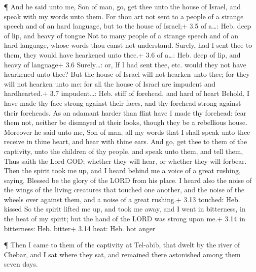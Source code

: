  ¶ And he said unto me, Son of man, go, get thee unto the
house of Israel, and speak with my words unto them.  For
thou art not sent to a people of a strange speech and of an hard
language, but to the house of Israel;+ 3.5 of a\ldots: Heb. deep of lip,
and heavy of tongue  Not to many people of a strange speech
and of an hard language, whose words thou canst not understand. Surely,
had I sent thee to them, they would have hearkened unto thee.+ 3.6 of
a\ldots: Heb. deep of lip, and heavy of language+ 3.6 Surely\ldots: or,
If I had sent thee, etc. would they not have hearkened unto thee?
 But the house of Israel will not hearken unto thee; for
they will not hearken unto me: for all the house of Israel are impudent
and hardhearted.+ 3.7 impudent\ldots: Heb. stiff of forehead, and hard
of heart  Behold, I have made thy face strong against their
faces, and thy forehead strong against their foreheads.  As
an adamant harder than flint have I made thy forehead: fear them not,
neither be dismayed at their looks, though they be a rebellious house.
 Moreover he said unto me, Son of man, all my words that I
shall speak unto thee receive in thine heart, and hear with thine ears.
 And go, get thee to them of the captivity, unto the
children of thy people, and speak unto them, and tell them, Thus saith
the Lord GOD; whether they will hear, or whether they will forbear.
 Then the spirit took me up, and I heard behind me a voice
of a great rushing, saying, Blessed be the glory of the LORD from his
place.  I heard also the noise of the wings of the living
creatures that touched one another, and the noise of the wheels over
against them, and a noise of a great rushing.+ 3.13 touched: Heb. kissed
 So the spirit lifted me up, and took me away, and I went
in bitterness, in the heat of my spirit; but the hand of the LORD was
strong upon me.+ 3.14 in bitterness: Heb. bitter+ 3.14 heat: Heb. hot
anger

 ¶ Then I came to them of the captivity at Tel-abib, that
dwelt by the river of Chebar, and I sat where they sat, and remained
there astonished among them seven days.

